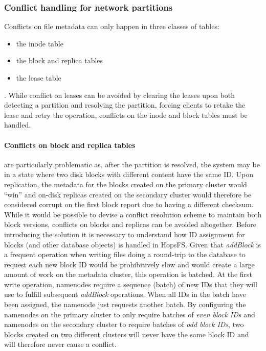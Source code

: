 \subsubsection{Conflict handling for network partitions}
Conflicts on file metadata can only happen in three classes of tables:
\begin{itemize}
    \item the inode table
    \item the block and replica tables
    \item the lease table
\end{itemize}.
While conflict on leases can be avoided by clearing the leases upon both detecting a partition and resolving the partition, forcing clients to retake the lease and retry the operation, conflicts on the inode and block tables must be handled.
\paragraph{Conflicts on block and replica tables} are particularly problematic as, after the partition is resolved, the system may be in a state where two disk blocks with different content have the same ID.
Upon replication, the metadata for the blocks created on the primary cluster would ``win'' and on-disk replicas created on the secondary cluster would therefore be considered corrupt on the first block report due to having a different checksum.
While it would be possible to devise a conflict resolution scheme to maintain both block versions, conflicts on blocks and replicas can be avoided altogether.
Before introducing the solution it is necessary to understand how ID assignment for blocks (and other database objects) is handled in HopsFS.
Given that \textit{addBlock} is a frequent operation when writing files doing a round-trip to the database to request each new block ID would be prohibitively slow and would create a large amount of work on the metadata cluster, this operation is batched.
At the first write operation, namenodes require a sequence (batch) of new IDs that they will use to fulfill subsequent \textit{addBlock} operations.
When all IDs in the batch have been assigned, the namenode just requests another batch.
By configuring the namenodes on the primary cluster to only require batches of \emph{even block IDs} and namenodes on the secondary cluster to require batches of \emph{odd block IDs}, two blocks created on two different clusters will never have the same block ID and will therefore never cause a conflict.

